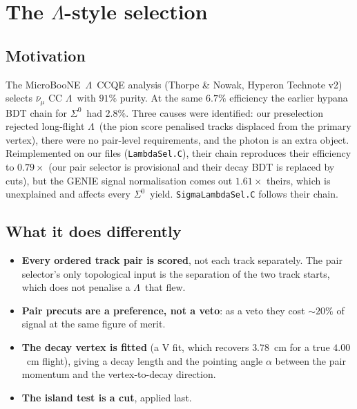\documentclass[11pt,a4paper]{article}
\newcommand{\Szero}{\ensuremath{\Sigma^{0}}}
\newcommand{\Lam}{\ensuremath{\Lambda}}
\newcommand{\uboone}{MicroBooNE}
\newcommand{\numubar}{\ensuremath{\bar{\nu}_\mu}}
\begin{document}
\section{The \Lam-style selection}
\label{sec:lambdastyle}

\subsection{Motivation}

The \uboone\ \Lam\ CCQE analysis (Thorpe \& Nowak, Hyperon Technote v2) selects
$\numubar$ CC \Lam\ with $91\%$ purity. At the same $6.7\%$ efficiency the earlier
hypana BDT chain for \Szero\ had $2.8\%$. Three causes were identified: our
preselection rejected long-flight \Lam\ (the pion score penalised tracks displaced
from the primary vertex), there were no pair-level requirements, and the photon is
an extra object. Reimplemented on our files (\texttt{LambdaSel.C}), their chain
reproduces their efficiency to $0.79\times$ (our pair selector is provisional and
their decay BDT is replaced by cuts), but the GENIE signal normalisation comes out
$1.61\times$ theirs, which is unexplained and affects every \Szero\ yield.
\texttt{SigmaLambdaSel.C} follows their chain.

\subsection{What it does differently}
\begin{itemize}
  \item \textbf{Every ordered track pair is scored}, not each track separately. The
        pair selector's only topological input is the separation of the two track
        starts, which does not penalise a \Lam\ that flew.
  \item \textbf{Pair precuts are a preference, not a veto}: as a veto they cost
        $\sim20\%$ of signal at the same figure of merit.
  \item \textbf{The decay vertex is fitted} (a V fit, which recovers $3.78$~cm for a
        true $4.00$~cm flight), giving a decay length and the pointing angle $\alpha$
        between the pair momentum and the vertex-to-decay direction.
  \item \textbf{The island test is a cut}, applied last.
\end{itemize}
\end{document}
